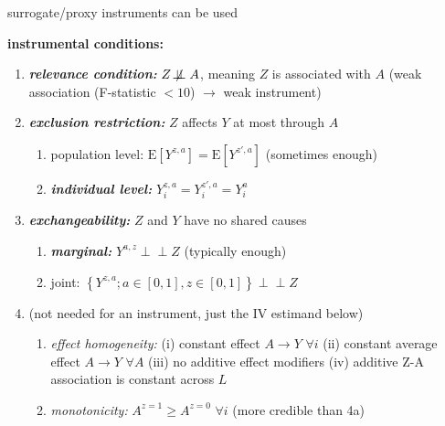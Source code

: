 \documentclass[8pt,twoside]{extarticle}
\newcommand{\indep}{\perp \!\!\! \perp}
\begin{document}
\begin{multicols}{2}
\noindent surrogate/proxy instruments can be used

\noindent \textbf{instrumental conditions:} 
\begin{enumerate}[itemsep=0em, topsep=0pt, partopsep=0pt,parsep=0pt, leftmargin=1.5em]
\setlength{\itemsep}{0pt}%
\setlength{\parskip}{0pt}
\item \textbf{\textit{relevance condition:}} $Z \not\!\indep A$, meaning $Z$ is associated with $A$ \newline (weak association (F-statistic $< 10$) $\rightarrow$ weak instrument)
\item \textbf{\textit{exclusion restriction:}} $Z$ affects $Y$ at most through $A$
\begin{enumerate}[itemsep=0em, topsep=0pt, partopsep=0pt,parsep=0pt, leftmargin=1.5em]
\setlength{\itemsep}{0pt}%
\setlength{\parskip}{0pt}
\item population level: $\mathrm{E}\left[Y^{z,a}\right] = \mathrm{E}\left[Y^{z',a}\right]$ (sometimes enough)
\item \textbf{\textit{individual level:}} $Y^{z,a}_i =  Y^{z',a}_i = Y^{a}_i$
\end{enumerate}
\item \textbf{\textit{exchangeability:}} $Z$ and $Y$ have no shared causes
\begin{enumerate}[itemsep=0em, topsep=0pt, partopsep=0pt,parsep=0pt, leftmargin=1.5em]
\setlength{\itemsep}{0pt}%
\setlength{\parskip}{0pt}
\item \textbf{\textit{marginal:}} $Y^{a,z} \indep Z$ (typically enough)
\item joint: $\left\{Y^{z, a};a\in\left[0,1\right],z\in\left[0,1\right]\right\} \indep Z$
\end{enumerate}
\item  (not needed for an instrument, just the IV estimand below)
\begin{enumerate}[itemsep=0em, topsep=0pt, partopsep=0pt,parsep=0pt, leftmargin=1.5em]
\setlength{\itemsep}{0pt}%
\setlength{\parskip}{0pt}
\item \textit{effect homogeneity:} (i) constant effect $A\rightarrow Y \,\, \forall i$ (ii) constant average effect $A\rightarrow Y \,\, \forall A$ (iii) no additive effect modifiers (iv) additive Z-A association is constant across $L$
\item \textit{monotonicity:} $A^{z=1} \geq A^{z=0} \,\, \forall i$ (more credible than 4a)
\end{enumerate}
\end{enumerate}


\end{multicols}
\end{document}
